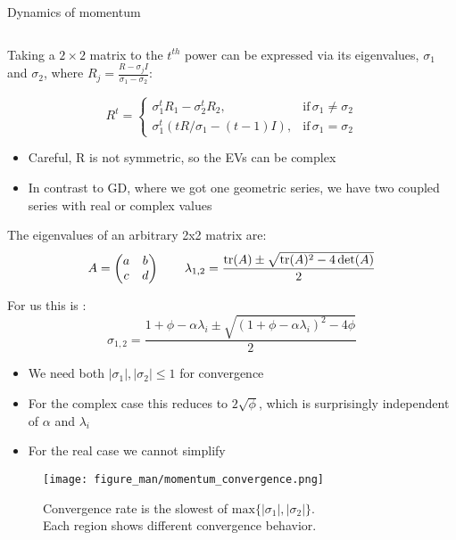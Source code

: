 \documentclass[11pt,compress,t,notes=noshow, xcolor=table]{beamer}
\begin{document}
\begin{vbframe}{Dynamics of momentum}
\begin{footnotesize}
\begin{equation*}
\end{equation*}

\end{footnotesize}

\framebreak

Taking a $2 \times 2$ matrix to the $t^{th}$ power can be expressed via its eigenvalues, 
$\sigma_1$ and $\sigma_2$, where $R_j = \frac{R - \sigma_j I}{\sigma_1 - \sigma_2}$:

$$
R^t=\begin{cases}
\sigma_1^t R_1 - \sigma_2^t R_2, & \text{if} \, \sigma_1 \neq \sigma_2 \\
\sigma_1^t (t R/\sigma_1 - (t-1) I), & \text{if} \, \sigma_1 = \sigma_2 
\end{cases}
$$





\begin{itemize}
\item Careful, R is not symmetric, so the EVs can be complex
\item In contrast to GD, where we got one geometric series, we have two coupled series with real or complex values
\end{itemize}


\framebreak

The eigenvalues of an arbitrary 2x2 matrix are: 
$$ A =\begin{pmatrix} a & b \\ c & d \end{pmatrix} \qquad
\lambda_{1,2} =  \frac{\operatorname{tr}(A)  \pm \sqrt{ \operatorname{tr}(A)^2 -  4\det(A)}}{2}
$$

For us this is :
$$
\sigma_{1,2} =  \frac{1+\phi-\alpha \lambda_i \pm \sqrt{ (1+\phi-\alpha \lambda_i)^2  -  4\phi }}{2}
$$

\begin{itemize}
 \item We need both $|\sigma_1|,|\sigma_2| \leq 1$ for convergence
 \item For the complex case this reduces to $2 \sqrt{\phi}$, which is surprisingly independent of $\alpha$ and $\lambda_i$
\item For the real case we cannot simplify 

\end{itemize}

\framebreak
\begin{figure}
	\texttt{[image: figure\_man/momentum\_convergence.png]} \\
	\begin{footnotesize} 
		Convergence rate is the slowest of $\text{max} \{|\sigma_1|, |\sigma_2| \}$.\\
        Each region shows different convergence behavior. 
	\end{footnotesize}
\end{figure}


\end{vbframe}
\end{document}
